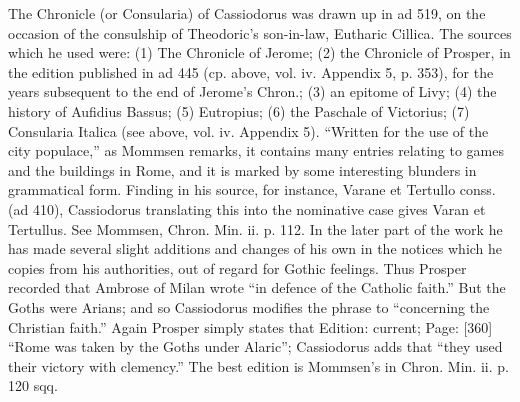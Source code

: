 The Chronicle (or Consularia) of Cassiodorus was drawn up in ad 519, on the occasion of the consulship of Theodoric\texthebrew{}’s son-in-law, Eutharic Cillica. The sources which he used were: (1) The Chronicle of Jerome; (2) the Chronicle of Prosper, in the edition published in ad 445 (cp. above, vol. iv. Appendix 5, p. 353), for the years subsequent to the end of Jerome\texthebrew{}’s Chron.; (3) an epitome of Livy; (4) the history of Aufidius Bassus; (5) Eutropius; (6) the Paschale of Victorius; (7) Consularia Italica (see above, vol. iv. Appendix 5). \texthebrew{“}Written for the use of the city populace,\texthebrew{}” as Mommsen remarks, it contains many entries relating to games and the buildings in Rome, and it is marked by some interesting blunders in grammatical form. Finding in his source, for instance, Varane et Tertullo conss. (ad 410), Cassiodorus translating this into the nominative case gives Varan et Tertullus. See Mommsen, Chron. Min. ii. p. 112. In the later part of the work he has made several slight additions and changes of his own in the notices which he copies from his authorities, out of regard for Gothic feelings. Thus Prosper recorded that Ambrose of Milan wrote \texthebrew{“}in defence of the Catholic faith.\texthebrew{}” But the Goths were Arians; and so Cassiodorus modifies the phrase to \texthebrew{“}concerning the Christian faith.\texthebrew{}” Again Prosper simply states that Edition: current; Page: [360] \texthebrew{“}Rome was taken by the Goths under Alaric\texthebrew{}”; Cassiodorus adds that \texthebrew{“}they used their victory with clemency.\texthebrew{}” The best edition is Mommsen\texthebrew{}’s in Chron. Min. ii. p. 120 sqq.

